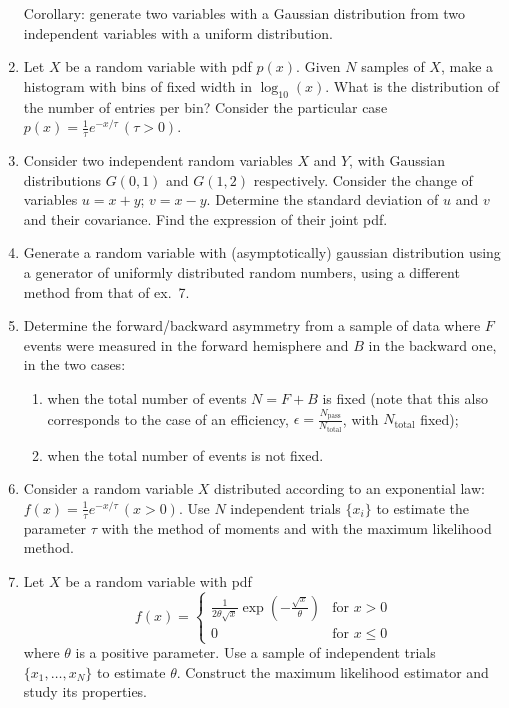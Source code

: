 \documentclass[a4paper,12pt]{article}
\begin{document}
\begin{enumerate}
  Corollary: generate two variables with a Gaussian distribution from two independent variables with a uniform distribution.
  \item Let $X$ be a random variable with pdf $p(x)$. Given $N$ samples of $X$, make a histogram with bins of fixed width in $\log_{10}(x)$. What is the distribution of the number of
  entries per bin? Consider the particular case $p(x) = \frac{1}{\tau}e^{-x/\tau}\,(\tau>0)$.
  \item Consider two independent random variables $X$ and $Y$, with Gaussian distributions $G(0,1)$ and $G(1,2)$ respectively. Consider the change of variables $u=x+y$; $v=x-y$.
  Determine the standard deviation of $u$ and $v$ and their covariance. Find the expression of their joint pdf.
  \item Generate a random variable with (asymptotically) gaussian distribution using a generator of uniformly distributed random numbers, using a different method from that of ex.~7.
  \item Determine the forward/backward asymmetry from a sample of data where $F$ events were measured in the forward hemisphere and $B$ in the backward one, in the two cases:
  \begin{enumerate}
   \item when the total number of events $N=F+B$ is fixed (note that this also corresponds to the case of an efficiency, $\epsilon = \frac{N_\text{pass}}{N_\text{total}}$, with $N_\text{total}$ fixed);
   \item when the total number of events is not fixed.
  \end{enumerate}
  \item Consider a random variable $X$ distributed according to an exponential law: $f(x) = \frac{1}{\tau} e^{-x/\tau}\,(x>0)$. Use $N$ independent trials $\{x_i\}$ to estimate the 
  parameter $\tau$ with the method of moments and with the maximum likelihood method.
  \item Let $X$ be a random variable with pdf 
  $$f(x) = \begin{cases} 
      \frac{1}{2\theta\sqrt{x}}\exp\left(-\frac{\sqrt{x}}{\theta}\right) & \text{for } x>0 \\ 
      0 & \text{for } x \leq 0
   \end{cases}$$
   where $\theta$ is a positive parameter. Use a sample of independent trials $\{x_1, \dots, x_N\}$ to estimate $\theta$. Construct the maximum likelihood estimator and study its properties.

\end{enumerate}
\end{document}
